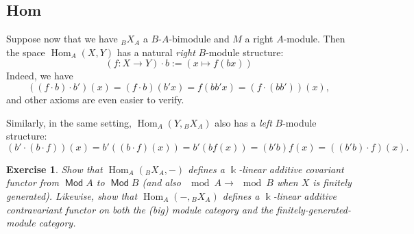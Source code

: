 \documentclass[11pt,a4paper]{article}
\numberwithin{equation}{section}
\theoremstyle{all}
\newtheorem{lemma}[theorem]{Lemma}
\newtheorem{exercise}[theorem]{Exercise}
\theoremstyle{remark}
\newtheorem{remark}[theorem]{Remark}
\newcommand{\Hom}{\operatorname{Hom}\nolimits}
\DeclareMathOperator{\Mod}{\mathsf{Mod}}
\newcommand{\defn}[1]{\textsl{\color{darkblue} #1}}
\begin{document}
\subsection{Hom}

Suppose now that we have ${}_BX_A$ a $B$-$A$-bimodule and $M$ a right $A$-module.
Then the space $\Hom_A(X,Y)$ has a natural \emph{right} $B$-module structure:
\[
(f:X\to Y)\cdot b := (x\mapsto f(bx))
\]
Indeed, we have \[
((f\cdot b)\cdot b')(x) = (f\cdot b)(b'x) = f(bb'x) = (f\cdot(bb'))(x),
\]
and other axioms are even easier to verify.

Similarly, in the same setting, $\Hom_A(Y,{}_BX_A)$ also has a \emph{left} $B$-module structure:
\[
(b'\cdot (b\cdot f))(x) = b'((b\cdot f)(x)) = b'( bf(x) ) = (b'b)f(x)=((b'b)\cdot f)(x).
\]  

\begin{exercise}
Show that $\Hom_A({}_BX_A,-)$ defines a $\Bbbk$-linear additive covariant functor from $\Mod A$ to $\Mod B$ (and also $\mod A\to \mod B$ when $X$ is finitely generated).
Likewise, show that $\Hom_A(-,{}_BX_A)$ defines a $\Bbbk$-linear additive contravariant functor on both the (big) module category and the finitely-generated-module category.
\end{exercise}

\end{document}
